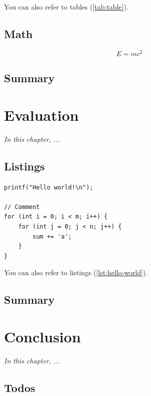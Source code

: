 \documentclass[
	12pt,
	a4paper,
	abstract,
	bibliography=totoc,
	chapterprefix,
	headings=openright,
	numbers=endperiod,
	parskip=half,
	twoside,
]{scrreprt}
\begin{document}
You can also refer to tables (\cref{tab:table}).

\section{Math}

\[
	E = m c^2
\]

\section*{Summary}

\lipsum[2]

\chapter{Evaluation}
\label{cha:evaluation}

\textit{In this chapter, ...}

\section{Listings}

\begin{listing}[ht]
\begin{verbatim}
printf("Hello world!\n");

// Comment
for (int i = 0; i < m; i++) {
	for (int j = 0; j < n; j++) {
		sum += 'a';
	}
}
\end{verbatim}
\caption{Caption}
\label{lst:hello-world}
\end{listing}

You can also refer to listings (\cref{lst:hello-world}).

\section*{Summary}

\lipsum[2]

\chapter{Conclusion}
\label{cha:conclusion}

\textit{In this chapter, ...}

\section{Todos}

\end{document}
